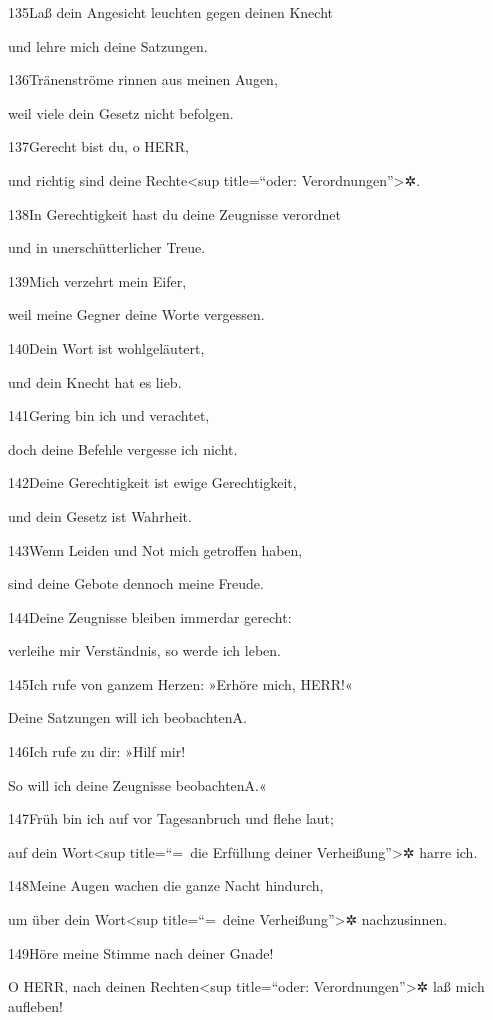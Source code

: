 135Laß dein Angesicht leuchten gegen deinen Knecht

und lehre mich deine Satzungen.

136Tränenströme rinnen aus meinen Augen,

weil viele dein Gesetz nicht befolgen.

137Gerecht bist du, o HERR,

und richtig sind deine Rechte\textless sup title=``oder:
Verordnungen''\textgreater✲.

138In Gerechtigkeit hast du deine Zeugnisse verordnet

und in unerschütterlicher Treue.

139Mich verzehrt mein Eifer,

weil meine Gegner deine Worte vergessen.

140Dein Wort ist wohlgeläutert,

und dein Knecht hat es lieb.

141Gering bin ich und verachtet,

doch deine Befehle vergesse ich nicht.

142Deine Gerechtigkeit ist ewige Gerechtigkeit,

und dein Gesetz ist Wahrheit.

143Wenn Leiden und Not mich getroffen haben,

sind deine Gebote dennoch meine Freude.

144Deine Zeugnisse bleiben immerdar gerecht:

verleihe mir Verständnis, so werde ich leben.

145Ich rufe von ganzem Herzen: »Erhöre mich, HERR!«

Deine Satzungen will ich beobachten{A}.

146Ich rufe zu dir: »Hilf mir!

So will ich deine Zeugnisse beobachten{A}.«

147Früh bin ich auf vor Tagesanbruch und flehe laut;

auf dein Wort\textless sup title=``=~die Erfüllung deiner
Verheißung''\textgreater✲ harre ich.

148Meine Augen wachen die ganze Nacht hindurch,

um über dein Wort\textless sup title=``=~deine Verheißung''\textgreater✲
nachzusinnen.

149Höre meine Stimme nach deiner Gnade!

O HERR, nach deinen Rechten\textless sup title=``oder:
Verordnungen''\textgreater✲ laß mich aufleben!

